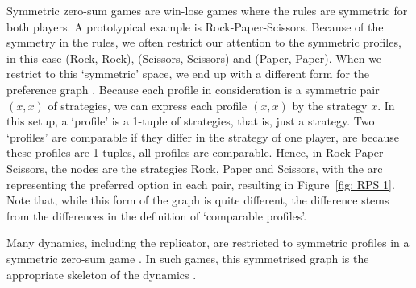 \documentclass[preprint,authoryear]{elsarticle}
\begin{document}
Symmetric zero-sum games are win-lose games where the rules are symmetric for both players. A prototypical example is Rock-Paper-Scissors. Because of the symmetry in the rules, we often restrict our attention to the symmetric profiles, in this case (Rock, Rock), (Scissors, Scissors) and (Paper, Paper). When we restrict to this `symmetric' space, we end up with a different form for the preference graph \citep{biggar_attractor_2024}. Because each profile in consideration is a symmetric pair $(x,x)$ of strategies, we can express each profile $(x,x)$ by the strategy $x$. In this setup, a `profile' is a 1-tuple of strategies, that is, just a strategy. Two `profiles' are comparable if they differ in the strategy of one player, are because these profiles are 1-tuples, all profiles are comparable. Hence, in Rock-Paper-Scissors, the nodes are the strategies Rock, Paper and Scissors, with the arc representing the preferred option in each pair, resulting in Figure~\ref{fig: RPS 1}. Note that, while this form of the graph is quite different, the difference stems from the differences in the definition of `comparable profiles'.

Many dynamics, including the replicator, are restricted to symmetric profiles in a symmetric zero-sum game \citep{smith1973logic}. In such games, this symmetrised graph is the appropriate skeleton of the dynamics \citep{biggar_attractor_2024}.

\begin{comment}
\begin{figure}
    \centering
    
    \caption{The preference graph of the symmetric zero-sum game Rock-Paper-Scissors.}
    \label{fig:RPS}
\end{figure}
\end{comment}


\end{document}
